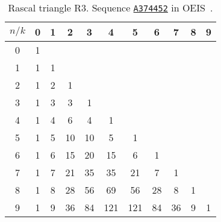 \begin{table}[H]
    \setlength\extrarowheight{-6pt}
    \begin{tabular}{c|cccccccccc}
        $n/k$ & 0 & 1 & 2  & 3  & 4   & 5   & 6  & 7  & 8 & 9 \\
        \hline
        0     & 1 &   &    &    &     &     &    &    &   &   \\
        1     & 1 & 1 &    &    &     &     &    &    &   &   \\
        2     & 1 & 2 & 1  &    &     &     &    &    &   &   \\
        3     & 1 & 3 & 3  & 1  &     &     &    &    &   &   \\
        4     & 1 & 4 & 6  & 4  & 1   &     &    &    &   &   \\
        5     & 1 & 5 & 10 & 10 & 5   & 1   &    &    &   &   \\
        6     & 1 & 6 & 15 & 20 & 15  & 6   & 1  &    &   &   \\
        7     & 1 & 7 & 21 & 35 & 35  & 21  & 7  & 1  &   &   \\
        8     & 1 & 8 & 28 & 56 & 69  & 56  & 28 & 8  & 1 &   \\
        9     & 1 & 9 & 36 & 84 & 121 & 121 & 84 & 36 & 9 & 1
    \end{tabular}
    \caption{Rascal triangle R3. Sequence \href{https://oeis.org/A374452}{\texttt{A374452}}
    in OEIS~\cite{kolosov2024iterated_R3}.}
    \label{tab:r3-triangle}
\end{table}
